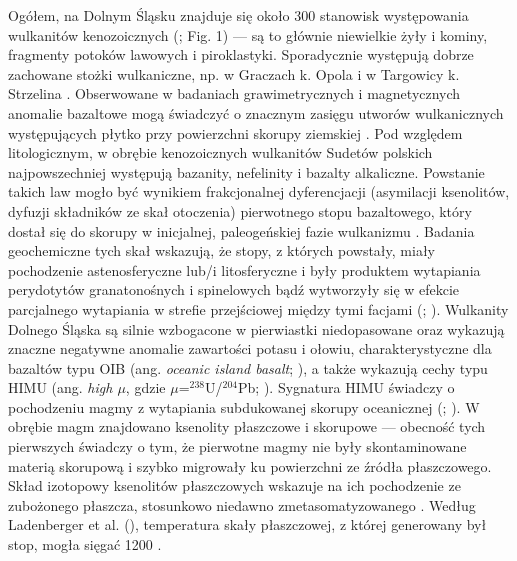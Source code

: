\documentclass[11.5pt,twoside]{report}
\begin{document}
 Ogółem, na Dolnym Śląsku znajduje się około 300 stanowisk występowania wulkanitów kenozoicznych (\cite{Badura.2005}; Fig. 1) --- są to głównie niewielkie żyły i kominy, fragmenty potoków lawowych i piroklastyki. Sporadycznie występują dobrze zachowane stożki wulkaniczne, np. w Graczach k. Opola i w Targowicy k. Strzelina \parencite{Krzeminska.2011}. Obserwowane w badaniach grawimetrycznych i magnetycznych anomalie bazaltowe mogą świadczyć o znacznym zasięgu utworów wulkanicznych występujących płytko przy powierzchni skorupy ziemskiej \parencite{Badura.2004}. Pod względem litologicznym, w obrębie kenozoicznych wulkanitów Sudetów polskich najpowszechniej występują bazanity, nefelinity i bazalty alkaliczne. Powstanie takich law mogło być wynikiem frakcjonalnej dyferencjacji (asymilacji ksenolitów, dyfuzji składników ze skał otoczenia) pierwotnego stopu bazaltowego, który dostał się do skorupy w inicjalnej, paleogeńskiej fazie wulkanizmu \parencite{Szymkowiak.1985}. Badania geochemiczne tych skał wskazują, że stopy, z których powstały, miały pochodzenie astenosferyczne lub/i litosferyczne i były produktem wytapiania perydotytów granatonośnych i spinelowych bąd\'{z} wytworzyły się w efekcie parcjalnego wytapiania w strefie przejściowej między tymi facjami (\cite{Puziewicz.2011}; \cite{Wilson.2006}). Wulkanity Dolnego Śląska są silnie wzbogacone w pierwiastki niedopasowane oraz wykazują znaczne negatywne anomalie zawartości potasu i ołowiu, charakterystyczne dla bazaltów typu OIB (ang. \textit{oceanic island basalt}; \cite{Ladenberger.2009}), a także wykazują cechy typu HIMU (ang. \textit{high $\mu$}, gdzie $\mu$=$^{238}$U/$^{204}$Pb; \cite{Wilson.1991}). Sygnatura HIMU świadczy o pochodzeniu magmy z wytapiania subdukowanej skorupy oceanicznej (\cite{Wilson.2001}; \cite{Helffrich.2001}). W obrębie magm znajdowano ksenolity płaszczowe i skorupowe --- obecność tych pierwszych świadczy o tym, że pierwotne magmy nie były skontaminowane materią skorupową i szybko migrowały ku powierzchni ze \'{z}ródła płaszczowego. Skład izotopowy ksenolitów płaszczowych wskazuje na ich pochodzenie ze zubożonego płaszcza, stosunkowo niedawno zmetasomatyzowanego \parencite{Ladenberger.2009}. Według Ladenberger et al. (\citeyear{Ladenberger.2009}), temperatura skały płaszczowej, z której generowany był stop, mogła sięgać 1200 \textcelsius.
 
\end{document}
